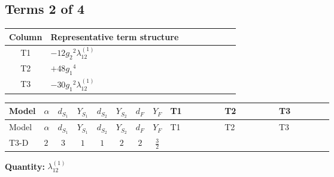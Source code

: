 \documentclass[8pt]{article}
\begin{document}
\begin{landscape}
\subsection*{Terms 2 of 4}
\begin{center}
\begin{tabular}{@{}c >{\raggedright\arraybackslash}p{0.82\linewidth}@{}}
\toprule
Column & Representative term structure \\
\midrule
T1 & \(\displaystyle -12 {g_2}^2 {\lambda_{12}^{(1)}}\) \\
\midrule
T2 & \(\displaystyle +48 {g_1}^4\) \\
\midrule
T3 & \(\displaystyle -30 {g_1}^2 {\lambda_{12}^{(1)}}\) \\
\midrule
\bottomrule
\end{tabular}
\end{center}
\smallskip
\tiny
\begin{longtable}{@{}llcccccc >{\raggedright\arraybackslash}p{0.21\linewidth} >{\raggedright\arraybackslash}p{0.21\linewidth} >{\raggedright\arraybackslash}p{0.21\linewidth}@{}}
\toprule
Model & $\alpha$ & $d_{S_1}$ & $Y_{S_1}$ & $d_{S_2}$ & $Y_{S_2}$ & $d_F$ & $Y_F$ & T1 & T2 & T3 \\
\midrule
\endfirsthead
\toprule
Model & $\alpha$ & $d_{S_1}$ & $Y_{S_1}$ & $d_{S_2}$ & $Y_{S_2}$ & $d_F$ & $Y_F$ & T1 & T2 & T3 \\
\midrule
\endhead
T3-D & $2$ & $3$ & $1$ & $1$ & $2$ & $2$ & $\frac{3}{2}$ & \scriptsize\adjustbox{max width=\linewidth}{$\begin{gathered} -12 {g_2}^2 {\lambda_{12}^{(1)}}\end{gathered}$} & \scriptsize\adjustbox{max width=\linewidth}{$\begin{gathered} +48 {g_1}^4\end{gathered}$} & \scriptsize\adjustbox{max width=\linewidth}{$\begin{gathered} -30 {g_1}^2 {\lambda_{12}^{(1)}}\end{gathered}$} \\
\midrule
\bottomrule
\end{longtable}
\clearpage
\noindent\textbf{Quantity: }$\lambda_{12}^{(1)}$\par\smallskip

\end{landscape}
\end{document}
